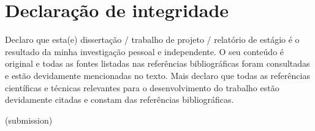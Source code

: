 
%

\chapter{Declaração de integridade}
Declaro que esta(e) dissertação / trabalho de projeto / relatório de estágio é o resultado da minha investigação pessoal e independente. O seu conteúdo é original e todas as fontes listadas nas referências bibliográficas foram consultadas e estão devidamente mencionadas no texto. Mais declaro que todas as referências científicas e técnicas relevantes para o desenvolvimento do trabalho estão devidamente citadas e constam das referências bibliográficas.

\bigskip

\begin{center}
   {\GetDocDate(submission)}
\end{center}
